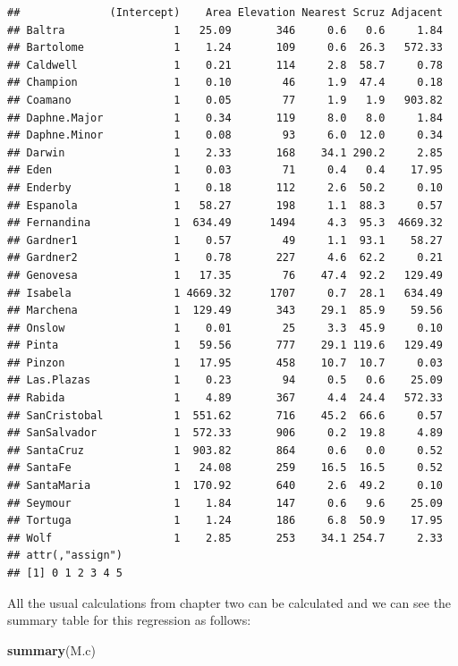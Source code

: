 \documentclass[]{book}
\newenvironment{Shaded}{\begin{snugshade}}{\end{snugshade}}
\newcommand{\KeywordTok}[1]{\textcolor[rgb]{0.13,0.29,0.53}{\textbf{{#1}}}}
\newcommand{\NormalTok}[1]{{#1}}
\theoremstyle{definition}
\theoremstyle{definition}
\theoremstyle{remark}
\begin{document}
\begin{verbatim}
##              (Intercept)    Area Elevation Nearest Scruz Adjacent
## Baltra                 1   25.09       346     0.6   0.6     1.84
## Bartolome              1    1.24       109     0.6  26.3   572.33
## Caldwell               1    0.21       114     2.8  58.7     0.78
## Champion               1    0.10        46     1.9  47.4     0.18
## Coamano                1    0.05        77     1.9   1.9   903.82
## Daphne.Major           1    0.34       119     8.0   8.0     1.84
## Daphne.Minor           1    0.08        93     6.0  12.0     0.34
## Darwin                 1    2.33       168    34.1 290.2     2.85
## Eden                   1    0.03        71     0.4   0.4    17.95
## Enderby                1    0.18       112     2.6  50.2     0.10
## Espanola               1   58.27       198     1.1  88.3     0.57
## Fernandina             1  634.49      1494     4.3  95.3  4669.32
## Gardner1               1    0.57        49     1.1  93.1    58.27
## Gardner2               1    0.78       227     4.6  62.2     0.21
## Genovesa               1   17.35        76    47.4  92.2   129.49
## Isabela                1 4669.32      1707     0.7  28.1   634.49
## Marchena               1  129.49       343    29.1  85.9    59.56
## Onslow                 1    0.01        25     3.3  45.9     0.10
## Pinta                  1   59.56       777    29.1 119.6   129.49
## Pinzon                 1   17.95       458    10.7  10.7     0.03
## Las.Plazas             1    0.23        94     0.5   0.6    25.09
## Rabida                 1    4.89       367     4.4  24.4   572.33
## SanCristobal           1  551.62       716    45.2  66.6     0.57
## SanSalvador            1  572.33       906     0.2  19.8     4.89
## SantaCruz              1  903.82       864     0.6   0.0     0.52
## SantaFe                1   24.08       259    16.5  16.5     0.52
## SantaMaria             1  170.92       640     2.6  49.2     0.10
## Seymour                1    1.84       147     0.6   9.6    25.09
## Tortuga                1    1.24       186     6.8  50.9    17.95
## Wolf                   1    2.85       253    34.1 254.7     2.33
## attr(,"assign")
## [1] 0 1 2 3 4 5
\end{verbatim}

All the usual calculations from chapter two can be calculated and we can
see the summary table for this regression as follows:

\begin{Shaded}
\begin{Highlighting}[]
\KeywordTok{summary}\NormalTok{(M.c)}
\end{Highlighting}
\end{Shaded}
\end{document}
